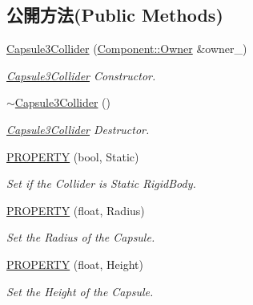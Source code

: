\subsection*{公開方法(Public Methods)}
\begin{DoxyCompactItemize}
\item 
\hyperlink{class_magnum_1_1_capsule3_collider_a587731f0c8651797ed4b1197247c5639}{Capsule3\+Collider} (\hyperlink{class_magnum_1_1_component_1_1_owner}{Component\+::\+Owner} \&owner\+\_\+)
\begin{DoxyCompactList}\small\item\em \hyperlink{class_magnum_1_1_capsule3_collider}{Capsule3\+Collider} Constructor. \end{DoxyCompactList}\item 
\hyperlink{class_magnum_1_1_capsule3_collider_ae058105f27b8c2d3c3d0bf71fa583982}{$\sim$\+Capsule3\+Collider} ()
\begin{DoxyCompactList}\small\item\em \hyperlink{class_magnum_1_1_capsule3_collider}{Capsule3\+Collider} Destructor. \end{DoxyCompactList}\item 
\hyperlink{class_magnum_1_1_capsule3_collider_a87a32059ca68bcd8b2d77e8832d73dbd}{P\+R\+O\+P\+E\+R\+TY} (bool, Static)
\begin{DoxyCompactList}\small\item\em Set if the Collider is Static Rigid\+Body. \end{DoxyCompactList}\item 
\hyperlink{class_magnum_1_1_capsule3_collider_aaa14f1904213a7798d18e292ee91dba4}{P\+R\+O\+P\+E\+R\+TY} (float, Radius)
\begin{DoxyCompactList}\small\item\em Set the Radius of the Capsule. \end{DoxyCompactList}\item 
\hyperlink{class_magnum_1_1_capsule3_collider_ad5be8792f944379a0a07285785a9bf96}{P\+R\+O\+P\+E\+R\+TY} (float, Height)
\begin{DoxyCompactList}\small\item\em Set the Height of the Capsule. \end{DoxyCompactList}\end{DoxyCompactItemize}
